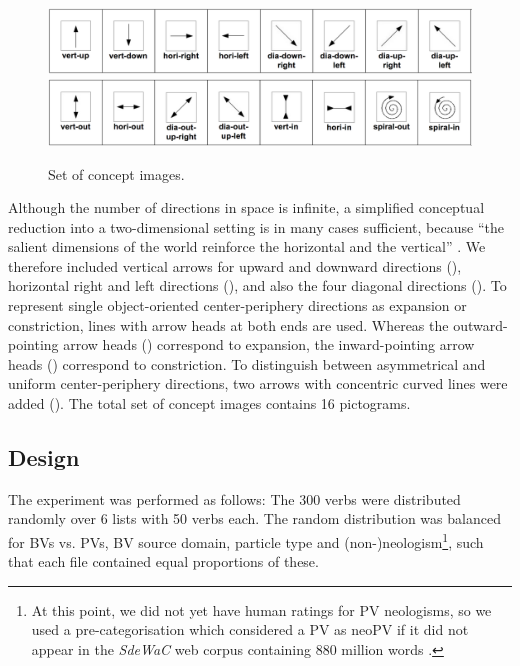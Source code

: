 \documentclass[output=paper]{langsci/langscibook}
\begin{document}
\begin{figure}[htbp]
  \vspace{+2mm}
  \caption{Set of concept images.}
  \label{fig:CIdir}
  \hspace*{+1mm}\includegraphics[width=.95\linewidth]{figures/CIs-1-8.png}
  \vspace{+3mm}\\
  \includegraphics[width=.95\linewidth]{figures/CIs-9-16}
\end{figure}

Although the number of directions in space is infinite, a simplified
conceptual reduction into a two-dimensional setting is in many cases
sufficient, because ``the salient dimensions of the world reinforce
the horizontal and the vertical'' \citep{Tversky:11}. We therefore
included vertical arrows for upward and downward directions
(), horizontal right and left directions
(), and also the four diagonal
directions (). To represent single object-oriented center-periphery
directions as expansion or constriction, lines with arrow heads at
both ends are used. Whereas the outward-pointing arrow heads
()
correspond to expansion, the inward-pointing arrow heads
() correspond to constriction. To distinguish
between asymmetrical and uniform center-periphery directions, two
arrows with concentric curved lines were added (). The total set of concept images contains 16 pictograms.


\subsection{Design}
\label{sec:design}

The experiment was performed as follows: The 300 verbs were
distributed randomly over 6 lists with 50 verbs each. The random
distribution was balanced for BVs vs. PVs, BV source domain, particle
type and (non-)neologism\footnote{At this point, we did not yet have
  human ratings for PV neologisms, so we used a pre-categorisation
  which considered a PV as neoPV if it did not appear in the
  \textit{SdeWaC} web corpus containing 880 million words
  \citep{Faass/Eckart:13}.}, such that each file contained equal
proportions of these.
\end{document}
